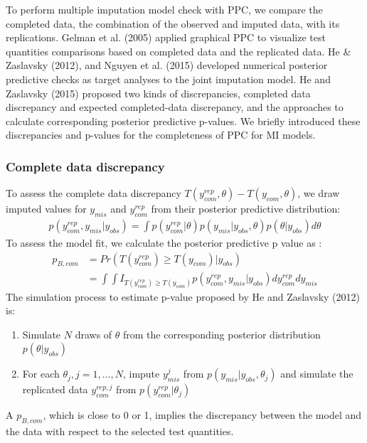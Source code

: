 \documentclass[12pt, fullpage, a4paper]{article}
\begin{document}
To perform multiple imputation model check with PPC, we compare the completed data, the combination of the observed and imputed data, with its replications. Gelman et al. (2005) applied graphical PPC to visualize test quantities comparisons based on completed data and the replicated data. He \& Zaslavsky (2012), and Nguyen et al. (2015) developed numerical posterior predictive checks as target analyses to the joint imputation model. He and Zaslavsky (2015) proposed two kinds of discrepancies, completed data discrepancy and expected completed-data discrepancy, and the approaches to calculate corresponding posterior predictive p-values. We briefly introduced these discrepancies and p-values for the completeness of PPC for MI models.

\subsubsection{Complete data discrepancy}
To assess the complete data discrepancy $T(y_{com}^{rep}, \theta) - T(y_{com}, \theta)$, we draw imputed values for $y_{mis}$ and $y_{com}^{rep}$ from their posterior predictive distribution:
\begin{equation}
\begin{array}{ll}
p(y_{com}^{rep}, y_{mis}|y_{obs}) = \int p(y_{com}^{rep}|\theta)p(y_{mis}|y_{obs}, \theta)p(\theta|y_{obs})d\theta
\end{array} 
\end{equation}
To assess the model fit, we calculate the posterior predictive p value as :
\begin{equation}
\begin{array}{ll}
p_{B, com} &= Pr(T(y_{com}^{rep}) \ge T(y_{com})|y_{obs})\\
&= \int\int I_{T(y_{com}^{rep}) \ge T(y_{com})}p(y_{com}^{rep}, y_{mis}|y_{obs})dy_{com}^{rep}dy_{mis}
\end{array} 
\end{equation}
The simulation process to estimate p-value proposed by He and Zaslavsky (2012) is:
\begin{enumerate}
	\item Simulate $N$ draws of $\theta$ from the corresponding posterior distribution $p(\theta|y_{obs})$
	\item For each $\theta_{j}, j=1, \dots, N$, impute $y_{mis}^j$ from $p(y_{mis}|y_{obs}, \theta_{j})$ and simulate the replicated data $y_{com}^{rep, j}$ from $p(y_{com}^{rep}|\theta_{j})$
\end{enumerate}
A $p_{B, com}$, which is close to 0 or 1, implies the discrepancy between the model and the data with respect to the selected test quantities.  
\end{document}
